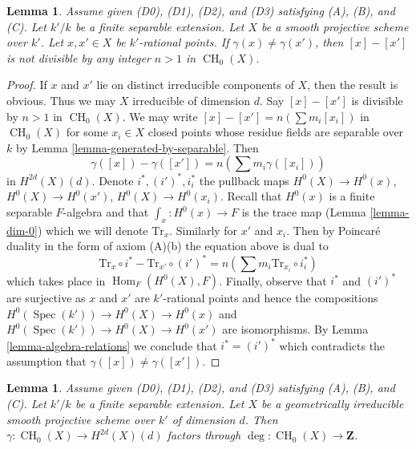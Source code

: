 \documentclass{stacks-project}
\theoremstyle{plain}
\newtheorem{lemma}[subsection]{Lemma}
\theoremstyle{definition}
\theoremstyle{remark}
\numberwithin{equation}{subsection}
\def\Spec{\mathop{\mathrm{Spec}}}
\def\Hom{\mathop{\mathrm{Hom}}\nolimits}
\def\CH{\mathop{\mathrm{CH}}\nolimits}
\begin{document}
\begin{lemma}
\label{lemma-relations-classes-points}
Assume given (D0), (D1), (D2), and (D3) satisfying (A), (B), and (C).
Let $k'/k$ be a finite separable extension.
Let $X$ be a smooth projective scheme over $k'$.
Let $x, x' \in X$ be $k'$-rational points.
If $\gamma(x) \not = \gamma(x')$, then
$[x] - [x']$ is not divisible by any integer $n > 1$ in $\CH_0(X)$.
\end{lemma}

\begin{proof}
If $x$ and $x'$ lie on distinct irreducible components of $X$, then
the result is obvious. Thus we may $X$ irreducible of dimension $d$.
Say $[x] - [x']$ is divisible by $n > 1$ in $\CH_0(X)$.
We may write $[x] - [x'] = n(\sum m_i [x_i])$ in $\CH_0(X)$
for some $x_i \in X$ closed points
whose residue fields are separable over $k$ by
Lemma \ref{lemma-generated-by-separable}.
Then
$$
\gamma([x]) - \gamma([x']) = n (\sum m_i \gamma([x_i]))
$$
in $H^{2d}(X)(d)$. Denote $i^*, (i')^*, i_i^*$ the pullback maps
$H^0(X) \to H^0(x)$, $H^0(X) \to H^0(x')$, $H^0(X) \to H^0(x_i)$.
Recall that $H^0(x)$ is a finite separable $F$-algebra
and that $\int_x : H^0(x) \to F$ is the trace map
(Lemma \ref{lemma-dim-0}) which we will denote $\text{Tr}_x$.
Similarly for $x'$ and $x_i$. Then by Poincar\'e duality in the form of
axiom (A)(b) the equation above is dual to
$$
\text{Tr}_x \circ i^* - \text{Tr}_{x'} \circ (i')^* =
n(\sum m_i \text{Tr}_{x_i} \circ i_i^*)
$$
which takes place in $\Hom_F(H^0(X), F)$. Finally, observe that
$i^*$ and $(i')^*$ are surjective as $x$ and $x'$ are $k'$-rational
points and hence the compositions $H^0(\Spec(k')) \to H^0(X) \to H^0(x)$
and $H^0(\Spec(k')) \to H^0(X) \to H^0(x')$ are isomorphisms.
By Lemma \ref{lemma-algebra-relations} we conclude that $i^* = (i')^*$
which contradicts the assumption that $\gamma([x]) \not = \gamma([x'])$.
\end{proof}

\begin{lemma}
\label{lemma-classes-points}
Assume given (D0), (D1), (D2), and (D3) satisfying (A), (B), and (C).
Let $k'/k$ be a finite separable extension. Let $X$ be a geometrically
irreducible smooth projective scheme over $k'$ of dimension $d$.
Then $\gamma : \CH_0(X) \to H^{2d}(X)(d)$ factors through
$\deg : \CH_0(X) \to \mathbf{Z}$.
\end{lemma}
\end{document}
